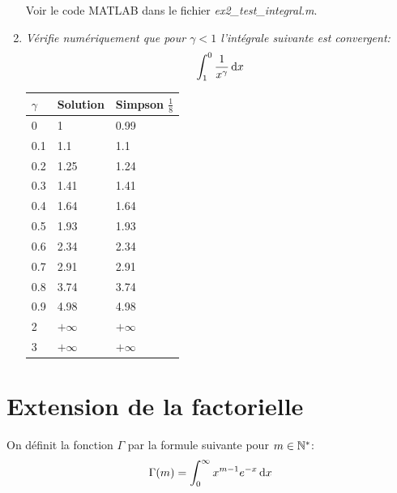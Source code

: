 \documentclass[a4paper,10pt]{article}
\begin{document}
\begin{enumerate}
    Voir le code MATLAB dans le fichier \emph{ex2\_test\_integral.m}.

    \item \emph{Vérifie numériquement que pour $\gamma < 1$ l'intégrale suivante est
    convergent:}
    \[
    \int_1^0 \frac{1}{x^{\gamma}} \,\mathrm{d} x
    \]

{
\renewcommand{\arraystretch}{1.2}
\begin{center}
\begin{tabular}{|l|l|l|}\hline

$\gamma$ & Solution     & Simpson $\frac{1}{8}$ \\\hline
0        & 1            & 0.99 \\\hline
0.1      & 1.1          & 1.1 \\\hline
0.2      & 1.25         & 1.24 \\\hline
0.3      & 1.41         & 1.41 \\\hline
0.4      & 1.64         & 1.64 \\\hline
0.5      & 1.93         & 1.93 \\\hline
0.6      & 2.34         & 2.34 \\\hline
0.7      & 2.91         & 2.91 \\\hline
0.8      & 3.74         & 3.74 \\\hline
0.9      & 4.98         & 4.98 \\\hline
2        & $+\infty$     & $+\infty$ \\\hline
3        & $+\infty$     & $+\infty$ \\\hline

\end{tabular}
\end{center}
}

\end{enumerate}

\section{Extension de la factorielle}
On définit la fonction $\Gamma$ par la formule suivante pour $m \in \mathbb{N}^*$:
\[
    \Gamma(m) = \int_0^{\infty} x^{m - 1}e^{-x} \,\mathrm{d} x
\]
\end{document}
